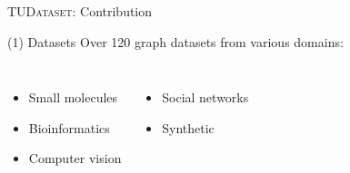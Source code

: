 \documentclass[utf8, xcolor=dvipsnames,ngerman]{beamer}
\begin{document}
\begin{frame}[t]{\textsc{TUDataset}: Contribution}

\begin{block}{(1) Datasets}
Over 120 graph datasets from various domains:

\begin{columns}[T]
  \begin{itemize}
    \item \alert<2>{Small molecules}
    \item \alert<3>{Bioinformatics}
    \item \alert<4>{Computer vision}
  \end{itemize}
  \begin{itemize}
    \item \alert<5>{Social networks}
    \item \alert<6>{Synthetic}
   \end{itemize}
\end{columns}
\end{block}


\end{frame}
\end{document}
